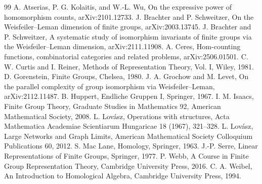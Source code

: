 \documentclass[11pt]{article}
\begin{document}
\begin{thebibliography}{99}
 A. Atserias, P. G. Kolaitis, and W.-L. Wu, On the expressive power of homomorphism counts, arXiv:2101.12733.
 J. Brachter and P. Schweitzer, On the Weisfeiler--Leman dimension of finite groups, arXiv:2003.13745.
 J. Brachter and P. Schweitzer, A systematic study of isomorphism invariants of finite groups via the Weisfeiler--Leman dimension, arXiv:2111.11908.
 A. Ceres, Hom-counting functions, combinatorial categories and related problems, arXiv:2506.01501.
 C. W. Curtis and I. Reiner, Methods of Representation Theory, Vol. I, Wiley, 1981.
 D. Gorenstein, Finite Groups, Chelsea, 1980.
 J. A. Grochow and M. Levet, On the parallel complexity of group isomorphism via Weisfeiler--Leman, arXiv:2112.11487.
 B. Huppert, Endliche Gruppen I, Springer, 1967.
 I. M. Isaacs, Finite Group Theory, Graduate Studies in Mathematics 92, American Mathematical Society, 2008.
 L. Lovász, Operations with structures, Acta Mathematica Academiae Scientiarum Hungaricae 18 (1967), 321--328.
 L. Lovász, Large Networks and Graph Limits, American Mathematical Society Colloquium Publications 60, 2012.
 S. Mac Lane, Homology, Springer, 1963.
 J.-P. Serre, Linear Representations of Finite Groups, Springer, 1977.
 P. Webb, A Course in Finite Group Representation Theory, Cambridge University Press, 2016.
 C. A. Weibel, An Introduction to Homological Algebra, Cambridge University Press, 1994.
\end{thebibliography}
\end{document}
